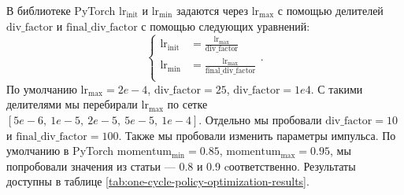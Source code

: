 \documentclass[conference]{IEEEtran}
\begin{document}
В библиотеке PyTorch $\text{lr}_\text{init}$ и $\text{lr}_\text{min}$ задаются через $\text{lr}_\text{max}$ с помощью делителей $\text{div\_factor}$ и $\text{final\_div\_factor}$ с помощью следующих уравнений:
\begin{equation*}
    \left\{
    \begin{aligned}
        \text{lr}_\text{init} &= \frac{\text{lr}_\text{max}}{\text{div\_factor}}\\
        \text{lr}_\text{min} &= \frac{\text{lr}_\text{max}}{\text{final\_div\_factor}}\\
    \end{aligned}
    \right..
\end{equation*}
По умолчанию $\text{lr}_\text{max} = 2e-4$, $\text{div\_factor} = 25$, $\text{div\_factor} = 1e4$. С такими делителями мы перебирали $\text{lr}_\text{max}$ по сетке $[5e-6,\ 1e-5,\ 2e-5,\ 5e-5,\ 1e-4]$. Отдельно мы пробовали $\text{div\_factor} = 10$ и $\text{final\_div\_factor} = 100$. Также мы пробовали изменить параметры импульса. По умолчанию в PyTorch $\text{momentum}_\text{min} = 0.85$, $\text{momentum}_\text{max} = 0.95$, мы попробовали значения из статьи --- 0.8 и 0.9 cоответственно. Результаты доступны в таблице \ref{tab:one-cycle-policy-optimization-results}.
\end{document}
